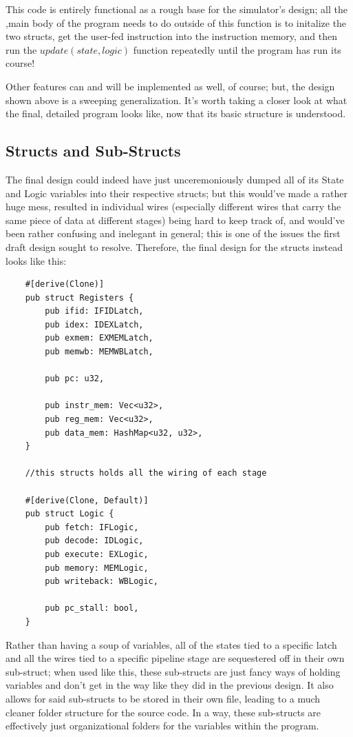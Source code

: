 \documentclass[12pt,twoside]{reedthesis}
\begin{document}
This code is entirely functional as a rough base for the simulator's design; all the ,main body of the program needs to do outside of this function is to initalize the two structs, get the user-fed instruction into the instruction memory, and then run the $update(state, logic)$ function repeatedly until the program has run its course!

Other features can and will be implemented as well, of course; but, the design shown above is a sweeping generalization. It's worth taking a closer look at what the final, detailed program looks like, now that its basic structure is understood.

\subsection*{Structs and Sub-Structs}

The final design could indeed have just unceremoniously dumped all of its State and Logic variables into their respective structs; but this would've made a rather huge mess, resulted in individual wires (especially different wires that carry the same piece of data at different stages) being hard to keep track of, and would've been rather confusing and inelegant in general; this is one of the issues the first draft design sought to resolve. Therefore, the final design for the structs instead looks like this:

\begin{lstlisting}
	#[derive(Clone)]
	pub struct Registers {
		pub ifid: IFIDLatch,
		pub idex: IDEXLatch,
		pub exmem: EXMEMLatch,
		pub memwb: MEMWBLatch,

		pub pc: u32,

		pub instr_mem: Vec<u32>,
		pub reg_mem: Vec<u32>,
		pub data_mem: HashMap<u32, u32>,
	}

	//this structs holds all the wiring of each stage

	#[derive(Clone, Default)]
	pub struct Logic {
		pub fetch: IFLogic,
		pub decode: IDLogic,
		pub execute: EXLogic,
		pub memory: MEMLogic,
		pub writeback: WBLogic,

		pub pc_stall: bool,
	}
\end{lstlisting}

Rather than having a soup of variables, all of the states tied to a specific latch and all the wires tied to a specific pipeline stage are sequestered off in their own sub-struct; when used like this, these sub-structs are just fancy ways of holding variables and don't get in the way like they did in the previous design. It also allows for said sub-structs to be stored in their own file, leading to a much cleaner folder structure for the source code. In a way, these sub-structs are effectively just organizational folders for the variables within the program.
\end{document}
